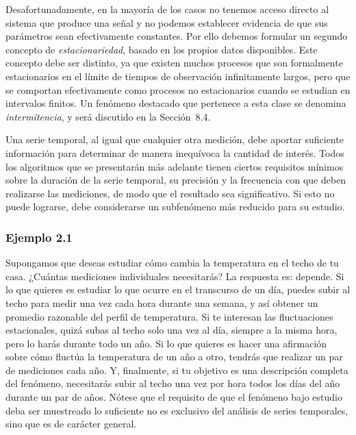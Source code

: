 \documentclass[10pt,a4paper]{book}
\begin{document}
\bigskip

Desafortunadamente, en la mayoría de los casos no tenemos acceso directo al sistema que produce una señal y no podemos establecer evidencia de que sus parámetros sean efectivamente constantes. Por ello debemos formular un segundo concepto de \emph{estacionariedad}, basado en los propios datos disponibles. Este concepto debe ser distinto, ya que existen muchos procesos que son formalmente estacionarios en el límite de tiempos de observación infinitamente largos, pero que se comportan efectivamente como procesos no estacionarios cuando se estudian en intervalos finitos. Un fenómeno destacado que pertenece a esta clase se denomina \emph{intermitencia}, y será discutido en la Sección~8.4.

Una serie temporal, al igual que cualquier otra medición, debe aportar suficiente información para determinar de manera inequívoca la cantidad de interés. Todos los algoritmos que se presentarán más adelante tienen ciertos requisitos mínimos sobre la duración de la serie temporal, su precisión y la frecuencia con que deben realizarse las mediciones, de modo que el resultado sea significativo. Si esto no puede lograrse, debe considerarse un subfenómeno más reducido para su estudio.

\newpage

\subsubsection*{Ejemplo 2.1}

Supongamos que deseas estudiar cómo cambia la temperatura en el techo de tu casa. ¿Cuántas mediciones individuales necesitarás? La respuesta es: depende. Si lo que quieres es estudiar lo que ocurre en el transcurso de un día, puedes subir al techo para medir una vez cada hora durante una semana, y así obtener un promedio razonable del perfil de temperatura. Si te interesan las fluctuaciones estacionales, quizá subas al techo solo una vez al día, siempre a la misma hora, pero lo harás durante todo un año. Si lo que quieres es hacer una afirmación sobre cómo fluctúa la temperatura de un año a otro, tendrás que realizar un par de mediciones cada año. Y, finalmente, si tu objetivo es una descripción completa del fenómeno, necesitarás subir al techo una vez por hora todos los días del año durante un par de años. Nótese que el requisito de que el fenómeno bajo estudio deba ser muestreado lo suficiente no es exclusivo del análisis de series temporales, sino que es de carácter general.  
\end{document}
